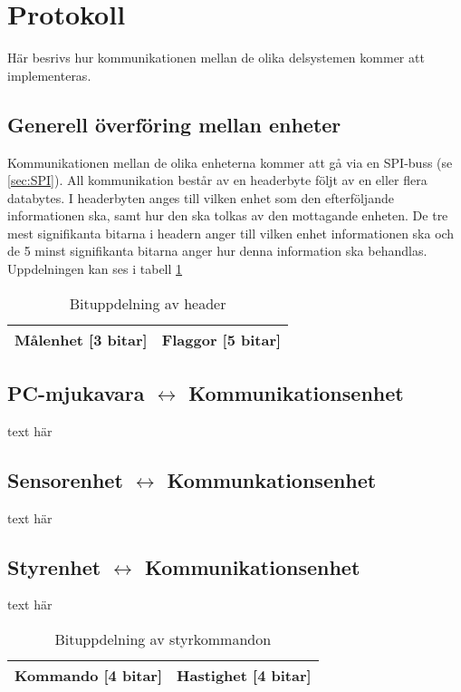 \section{Protokoll}
Här besrivs hur kommunikationen mellan de olika delsystemen kommer att implementeras.

\subsection{Generell överföring mellan enheter}
Kommunikationen mellan de olika enheterna kommer att gå via en SPI-buss (se \ref{sec:SPI}).
All kommunikation består av en headerbyte följt av en eller flera databytes.
I headerbyten anges till vilken enhet som den efterföljande informationen ska, samt hur den ska tolkas av den mottagande enheten.
De tre mest signifikanta bitarna i headern anger till vilken enhet informationen ska och de 5 minst signifikanta bitarna anger 
hur denna information ska behandlas. Uppdelningen kan ses i tabell \ref{tab:header}
\begin{table}[h]
  \centering
  \begin{tabular}{| c | c |}
    \hline
    Målenhet [3 bitar] & Flaggor [5 bitar]\\
    \hline
  \end{tabular}
  \caption{Bituppdelning av header}
  \label{tab:header}
\end{table}

\subsection{PC-mjukavara $\longleftrightarrow$ Kommunikationsenhet}
text här
\subsection{Sensorenhet $\longleftrightarrow$ Kommunkationsenhet}
text här
\subsection{Styrenhet $\longleftrightarrow$ Kommunikationsenhet}
text här

\begin{table}[h] 
        \begin{center}
                \begin{tabular}{| c | c |}
                        \hline
                        Kommando [4 bitar] & Hastighet [4 bitar] \\ \hline
                \end{tabular}
        \end{center}
        \caption{Bituppdelning av styrkommandon}
        \label{tab:styrbitar}
\end{table}
